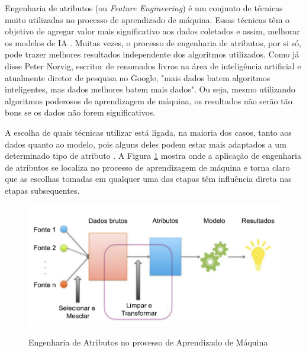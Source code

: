 \documentclass[oneside,openright,12pt]{ufsm_2015} %
\begin{document}
    \par Engenharia de atributos (ou \textit{Feature Engineering}) é um conjunto de técnicas muito utilizadas no processo de aprendizado de máquina. Essas técnicas têm o objetivo de agregar valor mais significativo aos dados coletados e assim, melhorar os modelos de IA \cite{book:zheng:2018}.  Muitas vezes, o processo de engenharia de atributos, por si só, pode trazer melhores resultados independente dos algoritmos utilizados. Como já disse Peter Norvig, escritor de renomados livros na área de inteligência artificial e atualmente diretor de pesquisa no Google, "mais dados batem algoritmos inteligentes, mas dados melhores batem mais dados". Ou seja, mesmo utilizando algoritmos poderosos de aprendizagem de máquina, os resultados não serão tão bons se os dados não forem significativos.
    
    \par A escolha de quais técnicas utilizar está ligada, na maioria dos casos, tanto aos dados quanto ao modelo, pois alguns deles podem estar mais adaptados a um determinado tipo de atributo \cite{book:zheng:2018}. A Figura \ref{fig:feature-engineering} mostra onde a aplicação de engenharia de atributos se localiza no processo de aprendizagem de máquina e torna claro que as escolhas tomadas em qualquer uma das etapas têm influência direta nas etapas subsequentes.
    
    \begin{figure}[ht]
        \caption{Engenharia de Atributos no processo de Aprendizado de Máquina}
        \centering
        \includegraphics[width=1\textwidth]{figuras/feature-engineering.png}
        \vspace{\baselineskip} %
        \label{fig:feature-engineering}
    \end{figure}
    
\end{document}
